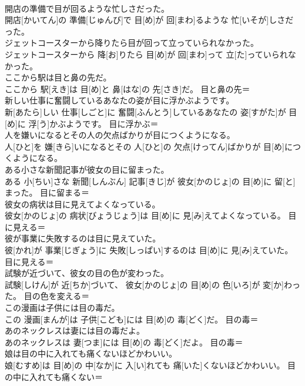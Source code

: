 \documentclass[8pt]{extreport}
\begin{document}
\begin{CJK}{UTF8}{min}
{\\	開店の準備で目が回るような忙しさだった。	
\\	開店[かいてん]の 準備[じゅんび]で 目[め]が 回[まわ]るような 忙[いそが]しさだった。	
\\	ジェットコースターから降りたら目が回って立っていられなかった。	
\\	ジェットコースターから 降[お]りたら 目[め]が 回[まわ]って 立[た]っていられなかった。	
\\	ここから駅は目と鼻の先だ。	
\\	ここから 駅[えき]は 目[め]と 鼻[はな]の 先[さき]だ。	目と鼻の先＝ 
\\	新しい仕事に奮闘しているあなたの姿が目に浮かぶようです。	
\\	新[あたら]しい 仕事[しごと]に 奮闘[ふんとう]しているあなたの 姿[すがた]が 目[め]に 浮[う]かぶようです。	目に浮かぶ＝ 
\\	人を嫌いになるとその人の欠点ばかりが目につくようになる。	
\\	人[ひと]を 嫌[きら]いになるとその 人[ひと]の 欠点[けってん]ばかりが 目[め]につくようになる。	
\\	ある小さな新聞記事が彼女の目に留まった。	
\\	ある 小[ちい]さな 新聞[しんぶん] 記事[きじ]が 彼女[かのじょ]の 目[め]に 留[と]まった。	目に留まる＝ 
\\	彼女の病状は目に見えてよくなっている。	
\\	彼女[かのじょ]の 病状[びょうじょう]は 目[め]に 見[み]えてよくなっている。	目に見える＝ 
\\	彼が事業に失敗するのは目に見えていた。	
\\	彼[かれ]が 事業[じぎょう]に 失敗[しっぱい]するのは 目[め]に 見[み]えていた。	目に見える＝ 
\\	試験が近づいて、彼女の目の色が変わった。	
\\	試験[しけん]が 近[ちか]づいて、 彼女[かのじょ]の 目[め]の 色[いろ]が 変[か]わった。	目の色を変える＝ 
\\	この漫画は子供には目の毒だ。	
\\	この 漫画[まんが]は 子供[こども]には 目[め]の 毒[どく]だ。	目の毒＝ 
\\	あのネックレスは妻には目の毒だよ。	
\\	あのネックレスは 妻[つま]には 目[め]の 毒[どく]だよ。	目の毒＝ 
\\	娘は目の中に入れても痛くないほどかわいい。	
\\	娘[むすめ]は 目[め]の 中[なか]に 入[い]れても 痛[いた]くないほどかわいい。	目の中に入れても痛くない＝ 
}
\end{CJK}
\end{document}
